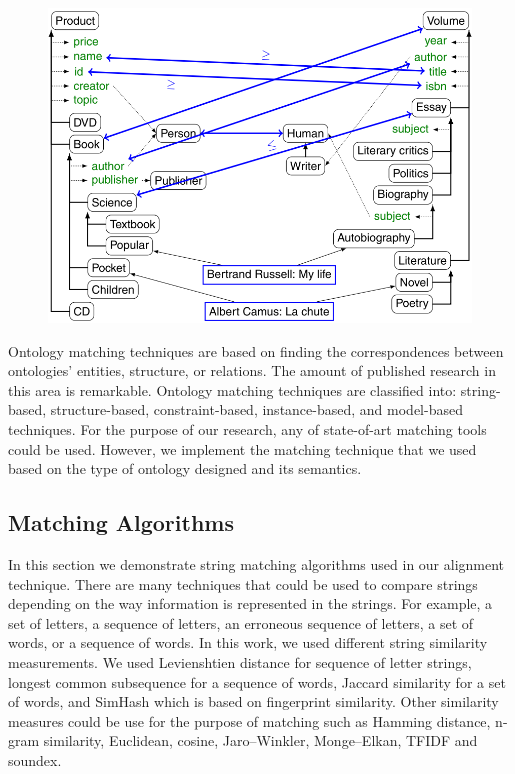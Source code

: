 \begin{figure}[H]
	\centering
	\includegraphics[scale=0.5]{./Fig/Ontologyalignmnet.png}
	\caption{}
	\label{fig:ontologyalognment}
\end{figure}


Ontology matching techniques are based on finding the correspondences between ontologies' entities, structure, or relations. The amount of published research in this area is remarkable. Ontology matching techniques are classified into: string-based, structure-based, constraint-based, instance-based, and model-based techniques. For the purpose of our research, any of state-of-art matching tools could be used. However, we implement the matching technique that we used based on the type of ontology designed and its semantics. 


\subsection{Matching Algorithms}

\label {secmatchingalgorithms}


In this section we demonstrate string matching algorithms used in our alignment technique. There are many techniques that could be used to compare strings depending on the way information is represented in the strings. For example, a set of letters, a sequence of letters, an erroneous sequence of letters, a set of words, or a sequence of words. In this work, we used different string similarity measurements. We used Levienshtien distance for sequence of letter strings, longest common subsequence for a sequence of words, Jaccard similarity for a set of words, and SimHash which is based on fingerprint similarity. Other similarity measures could be use for the purpose of matching such as Hamming distance, n-gram similarity, Euclidean, cosine,  Jaro–Winkler, Monge–Elkan, TFIDF and soundex.



